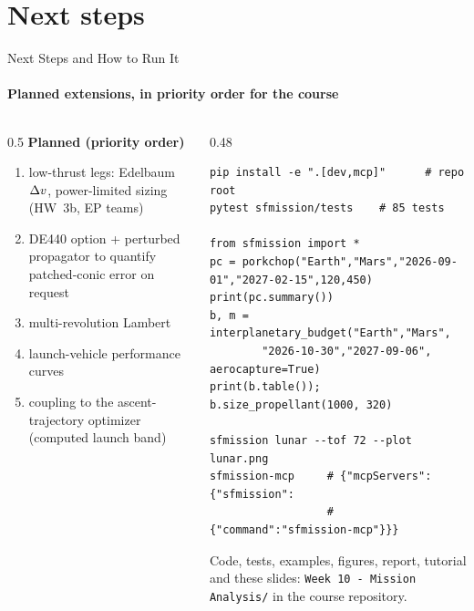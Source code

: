 \documentclass[aspectratio=169,10pt]{beamer}
\newcommand{\code}[1]{\texttt{#1}}
\begin{document}
\section{Next steps}
\begin{frame}[fragile]{Next Steps and How to Run It}
  \framesubtitle{Planned extensions, in priority order for the course}
\begin{columns}[T]
\begin{column}{0.5\textwidth}
\textbf{Planned (priority order)}
\begin{enumerate}
\item low-thrust legs: Edelbaum $\Delta v$, power-limited sizing (HW~3b, EP teams)
\item DE440 option + perturbed propagator to quantify patched-conic error on request
\item multi-revolution Lambert
\item launch-vehicle performance curves
\item coupling to the ascent-trajectory optimizer (computed launch band)
\end{enumerate}
\end{column}
\begin{column}{0.48\textwidth}
\begin{lstlisting}
pip install -e ".[dev,mcp]"      # repo root
pytest sfmission/tests    # 85 tests

from sfmission import *
pc = porkchop("Earth","Mars","2026-09-01","2027-02-15",120,450)
print(pc.summary())
b, m = interplanetary_budget("Earth","Mars",
        "2026-10-30","2027-09-06", aerocapture=True)
print(b.table()); b.size_propellant(1000, 320)

sfmission lunar --tof 72 --plot lunar.png
sfmission-mcp     # {"mcpServers":{"sfmission":
                  #   {"command":"sfmission-mcp"}}}
\end{lstlisting}
\small Code, tests, examples, figures, report, tutorial and these slides: \code{Week 10 - Mission Analysis/} in the course repository.
\end{column}
\end{columns}
\end{frame}
\end{document}
